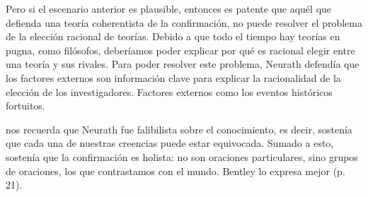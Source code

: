 Pero si el escenario anterior es plausible, entonces es patente que aquél que defienda una teoría coherentista de la confirmación, no puede resolver el problema de la elección racional de teorías.
Debido a que todo el tiempo hay teorías en pugna, como filósofos, deberíamos poder explicar por qué es racional elegir entre una teoría y sus rivales. Para poder resolver este problema, Neurath defendía que los factores externos son información clave para explicar la racionalidad de la elección de los investigadores.
Factores externos como los eventos históricos fortuitos.

\textcite{Bentley2023} nos recuerda que Neurath fue falibilista sobre el conocimiento, es decir,  sostenía que cada una de nuestras creencias puede estar equivocada.
Sumado a esto, sostenía que la confirmación es holista: no son oraciones particulares, sino grupos de oraciones, los que contrastamos con el mundo.
Bentley lo expresa mejor  (p. 21).









